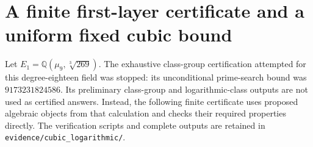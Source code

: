 \section{A finite first-layer certificate and a uniform fixed cubic bound}
\label{sec:cubic-layer-certificate}

Let $E_1=\mathbb Q(\mu_9,\sqrt[3]{269})$.  The exhaustive
class-group certification attempted for this degree-eighteen field
was stopped: its unconditional prime-search bound was
$9173231824586$.  Its preliminary class-group and logarithmic-class
outputs are not used as certified answers.  Instead, the following
finite certificate uses proposed algebraic objects from that
calculation and checks their required properties directly.
The verification scripts and complete outputs are retained in
\texttt{evidence/cubic\_logarithmic/}.

